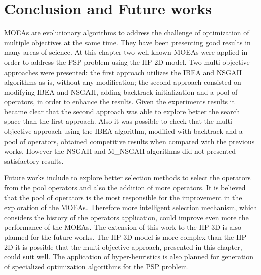 \section{Conclusion and Future works} \label{sec:conclusion}


MOEAs are evolutionary algorithms to address the challenge of optimization of multiple objectives at the same time. They have been presenting good results in many areas of science. At this chapter two well known MOEAs were applied in order to address the PSP problem using the HP-2D model. Two multi-objective approaches were presented: the first approach utilizes the IBEA and NSGAII algorithms as is, without any modification; the second approach consisted on modifying IBEA and NSGAII, adding backtrack initialization and a pool of operators, in order to enhance the results. Given the experiments results it became clear that the second approach was able to explore better the search space than the first approach. Also it was possible to check that the multi-objective approach using the IBEA algorithm, modified with backtrack and a pool of operators, obtained competitive results when compared with the previous works. However the NSGAII and M\_NSGAII algorithms did not presented satisfactory results. 


Future works include to explore better selection methods to select the operators from the pool operators and also the addition of more operators. It is believed that the pool of operators is the most responsible for the improvement in the exploration of the MOEAs. Therefore more intelligent selection mechanism, which considers the history of the operators application, could improve even more the performance of the MOEAs. The extension of this work to the HP-3D is also planned for the future works. The HP-3D model is more complex than the HP-2D it is possible that the multi-objective approach, presented in this chapter, could suit well. The application of hyper-heuristics is also planned for generation of specialized optimization algorithms for the PSP problem. 

